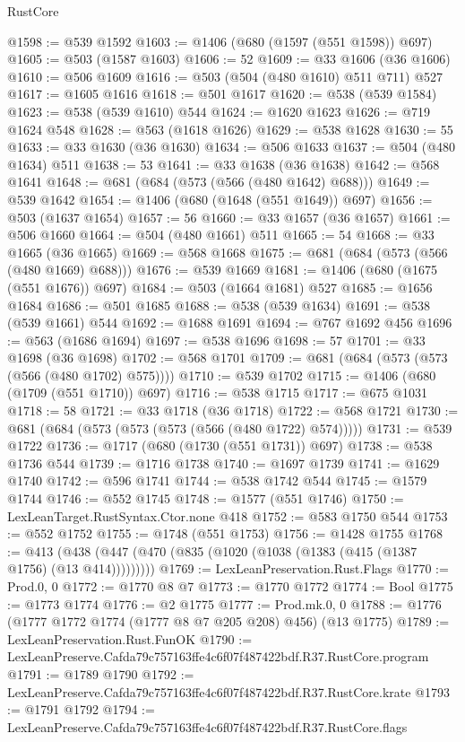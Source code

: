 \begin{lexlean}{RustCore}
\begin{coremodule}
@1598 := @539 @1592
@1603 := @1406 (@680 (@1597 (@551 @1598)) @697)
@1605 := @503 (@1587 @1603)
@1606 := 52
@1609 := @33 @1606 (@36 @1606)
@1610 := @506 @1609
@1616 := @503 (@504 (@480 @1610) @511 @711) @527
@1617 := @1605 @1616
@1618 := @501 @1617
@1620 := @538 (@539 @1584)
@1623 := @538 (@539 @1610) @544
@1624 := @1620 @1623
@1626 := @719 @1624 @548
@1628 := @563 (@1618 @1626)
@1629 := @538 @1628
@1630 := 55
@1633 := @33 @1630 (@36 @1630)
@1634 := @506 @1633
@1637 := @504 (@480 @1634) @511
@1638 := 53
@1641 := @33 @1638 (@36 @1638)
@1642 := @568 @1641
@1648 := @681 (@684 (@573 (@566 (@480 @1642) @688)))
@1649 := @539 @1642
@1654 := @1406 (@680 (@1648 (@551 @1649)) @697)
@1656 := @503 (@1637 @1654)
@1657 := 56
@1660 := @33 @1657 (@36 @1657)
@1661 := @506 @1660
@1664 := @504 (@480 @1661) @511
@1665 := 54
@1668 := @33 @1665 (@36 @1665)
@1669 := @568 @1668
@1675 := @681 (@684 (@573 (@566 (@480 @1669) @688)))
@1676 := @539 @1669
@1681 := @1406 (@680 (@1675 (@551 @1676)) @697)
@1684 := @503 (@1664 @1681) @527
@1685 := @1656 @1684
@1686 := @501 @1685
@1688 := @538 (@539 @1634)
@1691 := @538 (@539 @1661) @544
@1692 := @1688 @1691
@1694 := @767 @1692 @456
@1696 := @563 (@1686 @1694)
@1697 := @538 @1696
@1698 := 57
@1701 := @33 @1698 (@36 @1698)
@1702 := @568 @1701
@1709 := @681 (@684 (@573 (@573 (@566 (@480 @1702) @575))))
@1710 := @539 @1702
@1715 := @1406 (@680 (@1709 (@551 @1710)) @697)
@1716 := @538 @1715
@1717 := @675 @1031
@1718 := 58
@1721 := @33 @1718 (@36 @1718)
@1722 := @568 @1721
@1730 := @681 (@684 (@573 (@573 (@573 (@566 (@480 @1722) @574)))))
@1731 := @539 @1722
@1736 := @1717 (@680 (@1730 (@551 @1731)) @697)
@1738 := @538 @1736 @544
@1739 := @1716 @1738
@1740 := @1697 @1739
@1741 := @1629 @1740
@1742 := @596 @1741
@1744 := @538 @1742 @544
@1745 := @1579 @1744
@1746 := @552 @1745
@1748 := @1577 (@551 @1746)
@1750 := LexLeanTarget.RustSyntax.Ctor.none @418
@1752 := @583 @1750 @544
@1753 := @552 @1752
@1755 := @1748 (@551 @1753)
@1756 := @1428 @1755
@1768 := @413 (@438 (@447 (@470 (@835 (@1020 (@1038 (@1383 (@415 (@1387 @1756) (@13 @414)))))))))
@1769 := LexLeanPreservation.Rust.Flags
@1770 := Prod.{0, 0}
@1772 := @1770 @8 @7
@1773 := @1770 @1772
@1774 := Bool
@1775 := @1773 @1774
@1776 := @2 @1775
@1777 := Prod.mk.{0, 0}
@1788 := @1776 (@1777 @1772 @1774 (@1777 @8 @7 @205 @208) @456) (@13 @1775)
@1789 := LexLeanPreservation.Rust.FunOK
@1790 := LexLeanPreserve.Cafda79c757163ffe4c6f07f487422bdf.R37.RustCore.program
@1791 := @1789 @1790
@1792 := LexLeanPreserve.Cafda79c757163ffe4c6f07f487422bdf.R37.RustCore.krate
@1793 := @1791 @1792
@1794 := LexLeanPreserve.Cafda79c757163ffe4c6f07f487422bdf.R37.RustCore.flags

\end{coremodule}
\end{lexlean}
